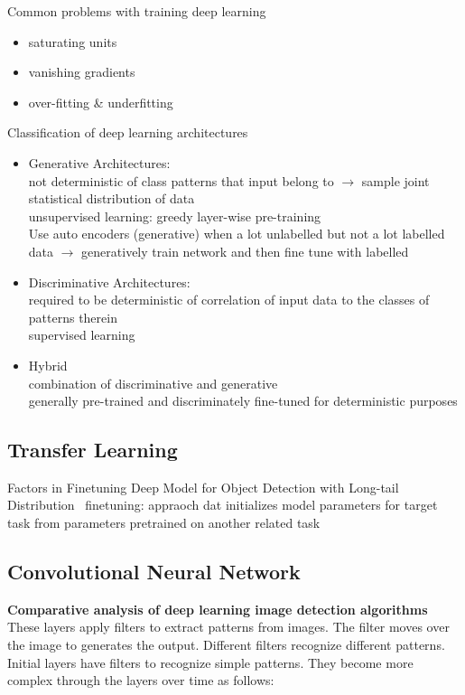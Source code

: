 Common problems with training deep learning
\begin{itemize}
    \item saturating units
    \item vanishing gradients
    \item over-fitting \& underfitting
\end{itemize}

Classification of deep learning architectures
\begin{itemize}
    \item Generative Architectures:\\
        not deterministic of class patterns that input belong to $\rightarrow$ sample joint
        statistical distribution of data\\
        unsupervised learning: greedy layer-wise pre-training\\
        Use auto encoders (generative) when a lot unlabelled but not a lot labelled data
        $\rightarrow$ generatively train network and then fine tune with labelled
    \item Discriminative Architectures:\\
        required to be deterministic of correlation of input data to the classes of patterns therein\\
        supervised learning
    \item Hybrid\\
        combination of discriminative and generative\\
        generally pre-trained and discriminately fine-tuned for deterministic purposes
\end{itemize}

\subsection*{Transfer Learning}
Factors in Finetuning Deep Model for Object Detection with Long-tail
Distribution~\citep{ouyang_factors_2016}
finetuning: appraoch dat initializes model parameters for target task from parameters pretrained on
another related task

\subsection*{Convolutional Neural Network}
\textbf{Comparative analysis of deep learning image detection
algorithms}~\citep{srivastava_comparative_2021}
These layers apply filters to extract patterns from images. The filter moves over the image to generates the output. Different filters recognize different patterns. Initial layers have filters to recognize simple patterns. They become more complex through the layers over time as follows:

